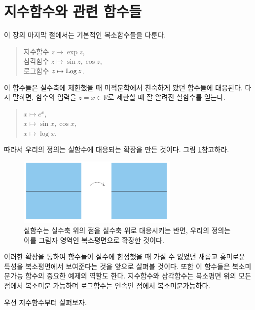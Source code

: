 \section{지수함수와 관련 함수들}

이 장의 마지막 절에서는 기본적인 복소함수들을 다룬다.
\begin{quote}
지수함수 $z\mapsto \exp z$, \\[1ex]
삼각함수 $z\mapsto \sin z, \cos z$, \\[1ex]
로그함수  $z\mapsto \mathop{\mathrm{Log}} z$.
\end{quote}

이 함수들은 실수축에 제한했을 때
미적분학에서 친숙하게 봤던 함수들에 대응된다.
다시 말하면, 
함수의 입력을 $z=x\in\mathbb R$로 제한할 때
잘 알려진 실함수를 얻는다.
\begin{quote}
$x\mapsto e^x$, \\[1ex]
$x\mapsto \sin x, \cos x$, \\[1ex]
$x\mapsto \log x$.
\end{quote}

따라서 우리의 정의는 실함수에 대응되는 확장을 만든 것이다.
그림 \ref{fig-1-13}\을 참고하라.

\begin{figure}[!h]
\begin{center}
\includegraphics[width=0.7\textwidth]{./SaltChapter/figs/fig-1-13}
\end{center}
\caption{실함수는 실수축 위의 점을 실수축 위로 대응시키는 반면,
우리의 정의는 이를 그림자 영역인 복소평면으로 확장한 것이다.}
\label{fig-1-13}
\end{figure}

이러한 확장을 통하여
함수들이 실수에 한정했을 때 가질 수 없었던 
새롭고 흥미로운 특성을 복소평면에서 보여준다는 것을 앞으로 살펴볼 것이다.
또한 이 함수들은 복소미분가능 함수의 중요한 예제의 역할도 한다.
지수함수와 삼각함수는 복소평면 위의 모든 점에서 복소미분 가능하며
로그함수는 연속인 점에서 복소미분가능하다.

우선  지수함수부터 살펴보자.


